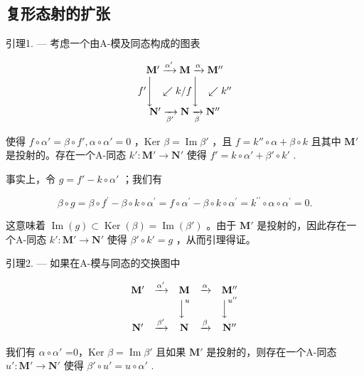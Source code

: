 \subsection{复形态射的扩张}

引理1. --- 考虑一个由A-模及同态构成的图表

\[
\begin{array}{c} \mathbf {M} ^ {\prime} \xrightarrow {\alpha^ {\prime}} \mathbf {M} \xrightarrow {\alpha} \mathbf {M} ^ {\prime \prime} \\ f ^ {\prime} \Biggl \downarrow \quad \swarrow k / f \Biggl \downarrow \quad \swarrow k ^ {\prime \prime} \\ \mathbf {N} ^ {\prime} \xrightarrow [ \beta^ {\prime} ]{} \mathbf {N} \xrightarrow [ \beta ]{} \mathbf {N} ^ {\prime \prime} \end{array}
\]

使得 \(f \circ \alpha' = \beta \circ f', \alpha \circ \alpha' = 0\) ，Ker \(\beta = \operatorname{Im} \beta'\) ，且 \(f = k'' \circ \alpha + \beta \circ k\) 且其中 \(\mathbf{M}'\) 是投射的。存在一个A-同态 \(k': \mathbf{M}' \to \mathbf{N}'\) 使得 \(f' = k \circ \alpha' + \beta' \circ k'\) .

事实上，令 \(g = f' - k \circ \alpha'\) ；我们有

\[
\beta \circ g = \beta \circ f ^ {\prime} - \beta \circ k \circ \alpha^ {\prime} = f \circ \alpha^ {\prime} - \beta \circ k \circ \alpha^ {\prime} = k ^ {\prime \prime} \circ \alpha \circ \alpha^ {\prime} = 0.
\]

这意味着 \(\operatorname{Im}(g) \subset \operatorname{Ker}(\beta) = \operatorname{Im}(\beta')\) 。由于 \(\mathbf{M}'\) 是投射的，因此存在一个A-同态 \(k': \mathbf{M}' \to \mathbf{N}'\) 使得 \(\beta' \circ k' = g\) ，从而引理得证。

引理2. --- 如果在A-模与同态的交换图中

\[
\begin{array}{c c c c c} \mathbf {M} ^ {\prime} & \xrightarrow {\alpha^ {\prime}} & \mathbf {M} & \xrightarrow {\alpha} & \mathbf {M} ^ {\prime \prime} \\ & & \Big \downarrow^ {u} & & \Big \downarrow^ {u ^ {\prime \prime}} \\ \mathbf {N} ^ {\prime} & \xrightarrow {\beta^ {\prime}} & \mathbf {N} & \xrightarrow {\beta} & \mathbf {N} ^ {\prime \prime} \end{array}
\]

我们有 \(\alpha\circ\alpha'\) =0，Ker \(\beta=\operatorname{Im}\beta'\) 且如果 \(\mathbf{M}'\) 是投射的，则存在一个A-同态 \(u':\mathbf{M}'\to\mathbf{N}'\) 使得 \(\beta'\circ u'=u\circ\alpha'\) .

